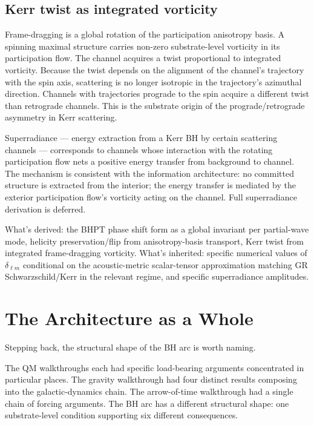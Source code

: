 \documentclass[11pt,a4paper]{article}
\begin{document}
\subsection{Kerr twist as integrated vorticity}

Frame-dragging is a global rotation of the participation anisotropy basis. A spinning maximal structure carries non-zero substrate-level vorticity in its participation flow. The channel acquires a twist proportional to integrated vorticity. Because the twist depends on the alignment of the channel's trajectory with the spin axis, scattering is no longer isotropic in the trajectory's azimuthal direction. Channels with trajectories prograde to the spin acquire a different twist than retrograde channels. This is the substrate origin of the prograde/retrograde asymmetry in Kerr scattering.

Superradiance --- energy extraction from a Kerr BH by certain scattering channels --- corresponds to channels whose interaction with the rotating participation flow nets a positive energy transfer from background to channel. The mechanism is consistent with the information architecture: no committed structure is extracted from the interior; the energy transfer is mediated by the exterior participation flow's vorticity acting on the channel. Full superradiance derivation is deferred.

What's derived: the BHPT phase shift form as a global invariant per partial-wave mode, helicity preservation/flip from anisotropy-basis transport, Kerr twist from integrated frame-dragging vorticity. What's inherited: specific numerical values of $\delta_{\ell m}$ conditional on the acoustic-metric scalar-tensor approximation matching GR Schwarzschild/Kerr in the relevant regime, and specific superradiance amplitudes.

\section{The Architecture as a Whole}

Stepping back, the structural shape of the BH arc is worth naming.

The QM walkthroughs each had specific load-bearing arguments concentrated in particular places. The gravity walkthrough had four distinct results composing into the galactic-dynamics chain. The arrow-of-time walkthrough had a single chain of forcing arguments. The BH arc has a different structural shape: one substrate-level condition supporting six different consequences.
\end{document}
